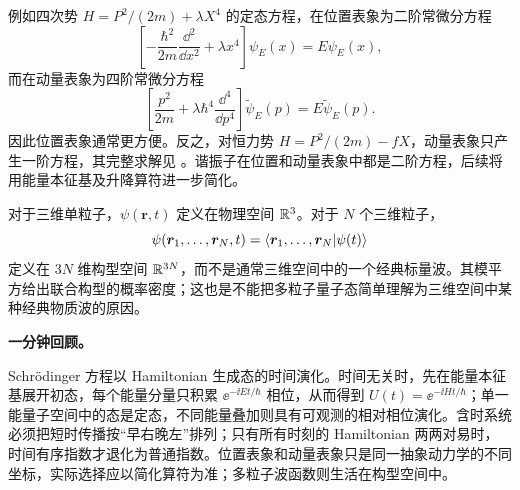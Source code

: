 例如四次势 $H=P^2/(2m)+\lambda X^4$ 的定态方程，在位置表象为二阶常微分方程
\begin{equation}
  \left[-\frac{\hbar^2}{2m}\frac{\dd^2}{\dd x^2}
  +\lambda x^4\right]\psi_E(x)=E\psi_E(x),
  \label{eq:QM-C04-S03-quartic-position}
\end{equation}
而在动量表象为四阶常微分方程
\begin{equation}
  \left[\frac{p^2}{2m}
  +\lambda\hbar^4\frac{\dd^4}{\dd p^4}\right]
  \widetilde\psi_E(p)=E\widetilde\psi_E(p).
  \label{eq:QM-C04-S03-quartic-momentum}
\end{equation}
因此位置表象通常更方便。反之，对恒力势 $H=P^2/(2m)-fX$，动量表象只产生一阶方程，其完整求解见
。谐振子在位置和动量表象中都是二阶方程，后续将用能量本征基及升降算符进一步简化。

对于三维单粒子，$\psi(\bm r,t)$ 定义在物理空间 $\mathbb{R}^3$。对于 $N$ 个三维粒子，
\begin{equation}
  \psi(\bm r_1,\ldots,\bm r_N,t)
  =\left\langle \bm r_1,\ldots,\bm r_N \middle| \psi(t) \right\rangle
  \label{eq:QM-C04-S03-many-particle-wavefunction}
\end{equation}
定义在 $3N$ 维构型空间 $\mathbb{R}^{3N}$，而不是通常三维空间中的一个经典标量波。其模平方给出联合构型的概率密度；这也是不能把多粒子量子态简单理解为三维空间中某种经典物质波的原因。

\textbf{一分钟回顾。}

Schrödinger 方程以 Hamiltonian 生成态的时间演化。时间无关时，先在能量本征基展开初态，每个能量分量只积累 $\ee^{-\ii Et/\hbar}$ 相位，从而得到 $U(t)=\ee^{-\ii Ht/\hbar}$；单一能量子空间中的态是定态，不同能量叠加则具有可观测的相对相位演化。含时系统必须把短时传播按“早右晚左”排列；只有所有时刻的 Hamiltonian 两两对易时，时间有序指数才退化为普通指数。位置表象和动量表象只是同一抽象动力学的不同坐标，实际选择应以简化算符为准；多粒子波函数则生活在构型空间中。
